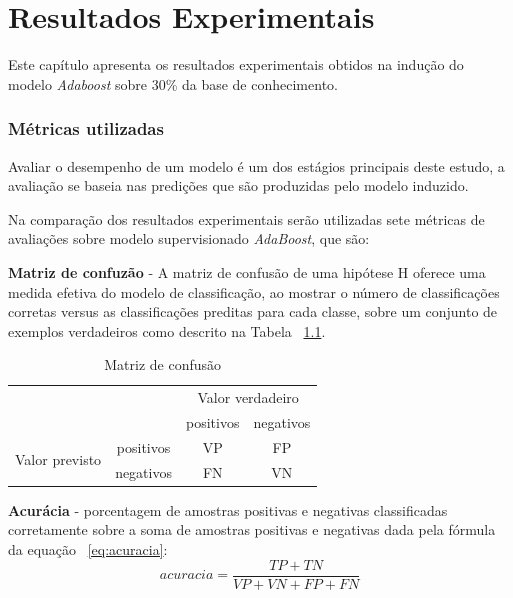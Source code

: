 \chapter{Resultados Experimentais}\label{result}

Este capítulo apresenta os resultados experimentais obtidos na indução do modelo \textit{Adaboost} sobre 30\% da base de conhecimento.

\subsection{Métricas utilizadas}

Avaliar o desempenho de um modelo é um dos estágios principais deste estudo, a avaliação se baseia nas predições que são produzidas pelo modelo induzido. 

Na comparação dos resultados experimentais serão utilizadas sete métricas de avaliações sobre modelo supervisionado \textit{AdaBoost}, que são:

\textbf{Matriz de confuzão} - A matriz de confusão de uma hipótese H oferece uma medida efetiva do modelo de classificação, ao mostrar o número de classificações corretas versus as classificações preditas para cada classe, sobre um conjunto de exemplos verdadeiros como descrito na Tabela ~\ref{tab:matrix_confusion}.

\begin{table}[H]
\centering
\caption{Matriz de confusão}
\begin{tabular}{rc|c|c|}
\cline{3-4}
\multicolumn{2}{c|}{\multirow{2}{*}{}} & \multicolumn{2}{c|}{Valor verdadeiro} \\ \cline{3-4} 
\multicolumn{2}{c|}{} & positivos & negativos \\ \hline
\multicolumn{1}{|c|}{\multirow{2}{*}{Valor previsto}} & positivos & VP & FP \\ \cline{2-4} 
\multicolumn{1}{|c|}{} & negativos & FN & VN \\ \hline
\end{tabular}
\label{tab:matrix_confusion}
\end{table}


\textbf{Acurácia} - porcentagem de amostras positivas e negativas classificadas corretamente sobre a soma de amostras positivas e negativas dada pela fórmula da equação ~\ref{eq:acuracia}:
\begin{equation} \label{eq:acuracia}
 acuracia = \frac{TP+TN}{VP+VN+FP+FN}
\end{equation}

